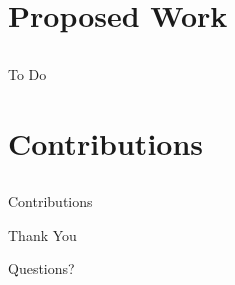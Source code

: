 \documentclass{beamer}
\begin{document}
\section{Proposed Work}
\subsection{}
%
\begin{frame}{To Do}

\end{frame}

\section{Contributions}
\subsection{}
%
\begin{frame}{Contributions}
\end{frame}
%
\begin{frame}{Thank You}
   \begin{center}
      \huge{Questions?}
   \end{center}
\end{frame}
%
\end{document}
